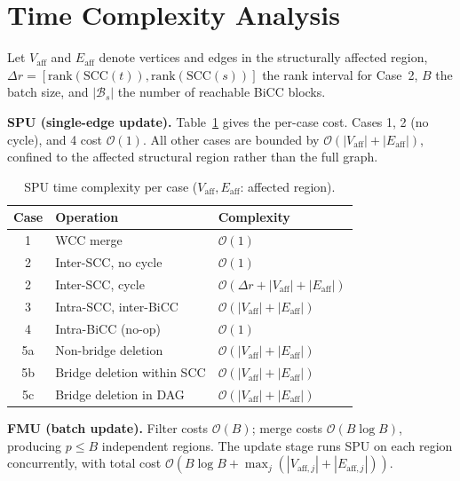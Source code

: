 \section{Time Complexity Analysis}
\label{subsec:complexity}

Let $V_{\mathrm{aff}}$ and $E_{\mathrm{aff}}$ denote vertices and edges in the structurally affected region,
$\Delta r = [\mathrm{rank}(\mathrm{SCC}(t)), \mathrm{rank}(\mathrm{SCC}(s))]$ the rank interval for Case~2,
$B$ the batch size, and $|\mathcal{B}_s|$ the number of reachable BiCC blocks.

\textbf{SPU (single-edge update).}
Table~\ref{tab:complexity_spu} gives the per-case cost.
Cases 1, 2 (no cycle), and 4 cost $\mathcal{O}(1)$.
All other cases are bounded by $\mathcal{O}(|V_{\mathrm{aff}}| + |E_{\mathrm{aff}}|)$,
confined to the affected structural region rather than the full graph.

\begin{table}[t]
\centering
\small
\setlength{\tabcolsep}{4pt}
\renewcommand{\arraystretch}{1.1}
\caption{SPU time complexity per case ($V_{\mathrm{aff}}, E_{\mathrm{aff}}$: affected region).}
\label{tab:complexity_spu}
\begin{tabular}{c l l}
\toprule
\textbf{Case} & \textbf{Operation} & \textbf{Complexity} \\
\midrule
1  & WCC merge                       & $\mathcal{O}(1)$ \\
2  & Inter-SCC, no cycle             & $\mathcal{O}(1)$ \\
2  & Inter-SCC, cycle                & $\mathcal{O}(\Delta r + |V_{\mathrm{aff}}| + |E_{\mathrm{aff}}|)$ \\
3  & Intra-SCC, inter-BiCC           & $\mathcal{O}(|V_{\mathrm{aff}}| + |E_{\mathrm{aff}}|)$ \\
4  & Intra-BiCC (no-op)              & $\mathcal{O}(1)$ \\
5a & Non-bridge deletion             & $\mathcal{O}(|V_{\mathrm{aff}}| + |E_{\mathrm{aff}}|)$ \\
5b & Bridge deletion within SCC      & $\mathcal{O}(|V_{\mathrm{aff}}| + |E_{\mathrm{aff}}|)$ \\
5c & Bridge deletion in DAG          & $\mathcal{O}(|V_{\mathrm{aff}}| + |E_{\mathrm{aff}}|)$ \\
\bottomrule
\end{tabular}
\end{table}

\textbf{FMU (batch update).}
Filter costs $\mathcal{O}(B)$; merge costs $\mathcal{O}(B \log B)$, producing $p \leq B$ independent regions.
The update stage runs SPU on each region concurrently, with total cost
$\mathcal{O}\!\left(B \log B + \max_{j}(|V_{\mathrm{aff},j}| + |E_{\mathrm{aff},j}|)\right)$.

